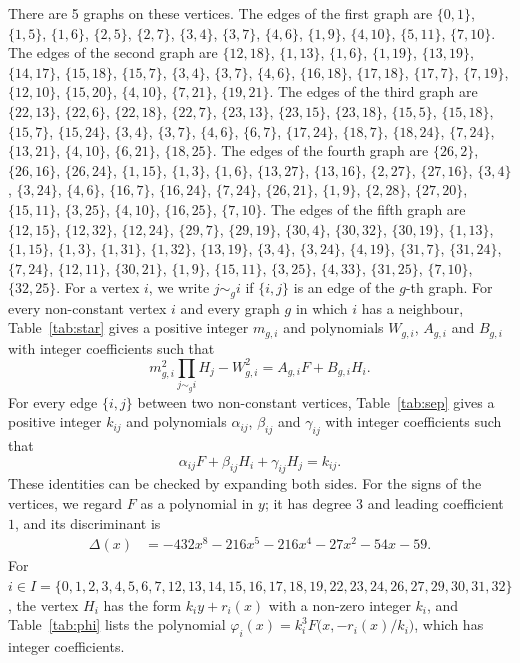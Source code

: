 \documentclass[11pt]{article}
\begin{document}
There are 5 graphs on these vertices. The edges of the first graph are $\{0,1\}$, $\{1,5\}$, $\{1,6\}$, $\{2,5\}$, $\{2,7\}$, $\{3,4\}$, $\{3,7\}$, $\{4,6\}$, $\{1,9\}$, $\{4,10\}$, $\{5,11\}$, $\{7,10\}$. The edges of the second graph are $\{12,18\}$, $\{1,13\}$, $\{1,6\}$, $\{1,19\}$, $\{13,19\}$, $\{14,17\}$, $\{15,18\}$, $\{15,7\}$, $\{3,4\}$, $\{3,7\}$, $\{4,6\}$, $\{16,18\}$, $\{17,18\}$, $\{17,7\}$, $\{7,19\}$, $\{12,10\}$, $\{15,20\}$, $\{4,10\}$, $\{7,21\}$, $\{19,21\}$. The edges of the third graph are $\{22,13\}$, $\{22,6\}$, $\{22,18\}$, $\{22,7\}$, $\{23,13\}$, $\{23,15\}$, $\{23,18\}$, $\{15,5\}$, $\{15,18\}$, $\{15,7\}$, $\{15,24\}$, $\{3,4\}$, $\{3,7\}$, $\{4,6\}$, $\{6,7\}$, $\{17,24\}$, $\{18,7\}$, $\{18,24\}$, $\{7,24\}$, $\{13,21\}$, $\{4,10\}$, $\{6,21\}$, $\{18,25\}$. The edges of the fourth graph are $\{26,2\}$, $\{26,16\}$, $\{26,24\}$, $\{1,15\}$, $\{1,3\}$, $\{1,6\}$, $\{13,27\}$, $\{13,16\}$, $\{2,27\}$, $\{27,16\}$, $\{3,4\}$, $\{3,24\}$, $\{4,6\}$, $\{16,7\}$, $\{16,24\}$, $\{7,24\}$, $\{26,21\}$, $\{1,9\}$, $\{2,28\}$, $\{27,20\}$, $\{15,11\}$, $\{3,25\}$, $\{4,10\}$, $\{16,25\}$, $\{7,10\}$. The edges of the fifth graph are $\{12,15\}$, $\{12,32\}$, $\{12,24\}$, $\{29,7\}$, $\{29,19\}$, $\{30,4\}$, $\{30,32\}$, $\{30,19\}$, $\{1,13\}$, $\{1,15\}$, $\{1,3\}$, $\{1,31\}$, $\{1,32\}$, $\{13,19\}$, $\{3,4\}$, $\{3,24\}$, $\{4,19\}$, $\{31,7\}$, $\{31,24\}$, $\{7,24\}$, $\{12,11\}$, $\{30,21\}$, $\{1,9\}$, $\{15,11\}$, $\{3,25\}$, $\{4,33\}$, $\{31,25\}$, $\{7,10\}$, $\{32,25\}$. For a vertex $i$, we write $j\sim_g i$ if $\{i,j\}$ is an edge of the $g$-th graph.
For every non-constant vertex $i$ and every graph $g$ in which $i$ has a neighbour, Table~\ref{tab:star} gives a positive integer $m_{g,i}$ and polynomials $W_{g,i}$, $A_{g,i}$ and $B_{g,i}$ with integer coefficients such that
\begin{equation}\label{eq:star}
m_{g,i}^2\prod_{j\sim_g i}H_j-W_{g,i}^2=A_{g,i}F+B_{g,i}H_i.
\end{equation}
For every edge $\{i,j\}$ between two non-constant vertices, Table~\ref{tab:sep} gives a positive integer $k_{ij}$ and polynomials $\alpha_{ij}$, $\beta_{ij}$ and $\gamma_{ij}$ with integer coefficients such that
\begin{equation}\label{eq:sep}
\alpha_{ij}F+\beta_{ij}H_i+\gamma_{ij}H_j=k_{ij}.
\end{equation}
These identities can be checked by expanding both sides.
For the signs of the vertices, we regard $F$ as a polynomial in $y$; it has degree $3$ and leading coefficient $1$, and its discriminant is
\begin{align*}
\Delta(x)&=-432x^{8}-216x^{5}-216x^{4}-27x^{2}-54x-59.
\end{align*}
For $i\in I=\{0,\allowbreak 1,\allowbreak 2,\allowbreak 3,\allowbreak 4,\allowbreak 5,\allowbreak 6,\allowbreak 7,\allowbreak 12,\allowbreak 13,\allowbreak 14,\allowbreak 15,\allowbreak 16,\allowbreak 17,\allowbreak 18,\allowbreak 19,\allowbreak 22,\allowbreak 23,\allowbreak 24,\allowbreak 26,\allowbreak 27,\allowbreak 29,\allowbreak 30,\allowbreak 31,\allowbreak 32\}$, the vertex $H_i$ has the form $k_iy+r_i(x)$ with a non-zero integer $k_i$, and Table~\ref{tab:phi} lists the polynomial $\varphi_i(x)=k_i^3F\bigl(x,-r_i(x)/k_i\bigr)$, which has integer coefficients.
\end{document}
